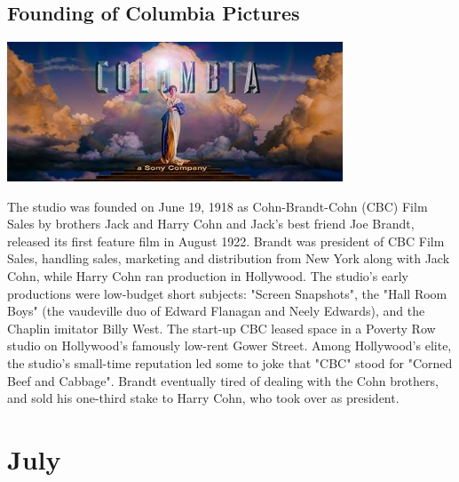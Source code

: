\documentclass[11pt]{report}
\begin{document}
\subsection{Founding of Columbia Pictures}
\vspace{2mm}\begin{center}\includegraphics[width=10cm]{./img/columbiaPicLogo.jpg}\end{center}
The studio was founded on June 19, 1918 as Cohn-Brandt-Cohn (CBC) Film Sales by brothers Jack and Harry Cohn and Jack's best friend Joe Brandt, released its first feature film in August 1922. Brandt was president of CBC Film Sales, handling sales, marketing and distribution from New York along with Jack Cohn, while Harry Cohn ran production in Hollywood. The studio's early productions were low-budget short subjects: "Screen Snapshots", the "Hall Room Boys" (the vaudeville duo of Edward Flanagan and Neely Edwards), and the Chaplin imitator Billy West. The start-up CBC leased space in a Poverty Row studio on Hollywood's famously low-rent Gower Street. Among Hollywood's elite, the studio's small-time reputation led some to joke that "CBC" stood for "Corned Beef and Cabbage". Brandt eventually tired of dealing with the Cohn brothers, and sold his one-third stake to Harry Cohn, who took over as president.
\section{July}
\end{document}
